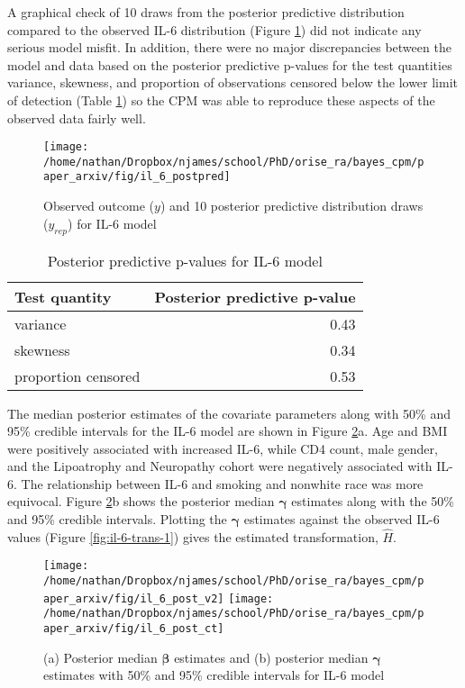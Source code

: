 \documentclass[
]{article}
\begin{document}
A graphical check of 10 draws from the posterior predictive distribution compared to the observed IL-6 distribution (Figure \ref{fig:il6-postpred}) did not indicate any serious model misfit. In addition, there were no major discrepancies between the model and data based on the posterior predictive p-values for the test quantities variance, skewness, and proportion of observations censored below the lower limit of detection (Table \ref{tab:ppptab1}) so the CPM was able to reproduce these aspects of the observed data fairly well.

\begin{figure}

{\centering \texttt{[image: /home/nathan/Dropbox/njames/school/PhD/orise\_ra/bayes\_cpm/paper\_arxiv/fig/il\_6\_postpred]} 

}

\caption{Observed outcome ($y$) and 10 posterior predictive distribution draws ($y_{rep}$) for IL-6 model}\label{fig:il6-postpred}
\end{figure}

\begin{table}[!h]

\caption{\label{tab:ppptab1}Posterior predictive p-values for IL-6 model}
\centering
\begin{tabular}[t]{lr}
\toprule
Test quantity & Posterior predictive p-value\\
\midrule
variance & 0.43\\
skewness & 0.34\\
proportion censored & 0.53\\
\bottomrule
\end{tabular}
\end{table}

The median posterior estimates of the covariate parameters along with 50\% and 95\% credible intervals for the IL-6 model are shown in Figure \ref{fig:il6-par00}a. Age and BMI were positively associated with increased IL-6, while CD4 count, male gender, and the Lipoatrophy and Neuropathy cohort were negatively associated with IL-6. The relationship between IL-6 and smoking and nonwhite race was more equivocal. Figure \ref{fig:il6-par00}b shows the posterior median \(\boldsymbol{\gamma}\) estimates along with the 50\% and 95\% credible intervals. Plotting the \(\boldsymbol{\gamma}\) estimates against the observed IL-6 values (Figure \ref{fig:il-6-trans-1}) gives the estimated transformation, \(\hat{H}\).

\begin{figure}

{\centering \texttt{[image: /home/nathan/Dropbox/njames/school/PhD/orise\_ra/bayes\_cpm/paper\_arxiv/fig/il\_6\_post\_v2]} \texttt{[image: /home/nathan/Dropbox/njames/school/PhD/orise\_ra/bayes\_cpm/paper\_arxiv/fig/il\_6\_post\_ct]} 

}

\caption{(a) Posterior median $\boldsymbol{\beta}$ estimates and (b) posterior median $\boldsymbol{\gamma}$ estimates with 50\% and 95\% credible intervals for IL-6 model}\label{fig:il6-par00}
\end{figure}
\end{document}
